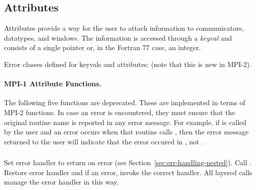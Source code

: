 \documentclass{article}
\begin{document}


\subsection{Attributes}
\label{sec:attr}

Attributes provide a way for the user to attach information to
communicators, datatypes, and windows.  The information is accessed
through a \emph{keyval} and consists of a single pointer or, in the
Fortran 77 case, an integer.

Error classes defined for keyvals and attributes:
 (note that this is new in MPI-2).


\paragraph{MPI-1 Attribute Functions.}
The following five functions are deprecated.  These are implemented in
terms of MPI-2 functions.  In case an error is encountered, they must 
ensure that the original routine name is reported in any error
message.  For example, if  is called by the
user and an error occurs when that routine calls
, then the error message returned to the
user will indicate that the error occured in , not
.

\subsubsection{}
Set error handler to return on error (see
Section~\ref{sec:err-handling-nested}).
Call .
Restore error handler and if an error, invoke the correct handler.
All layered calls manage the error handler in this way.
\end{document}
